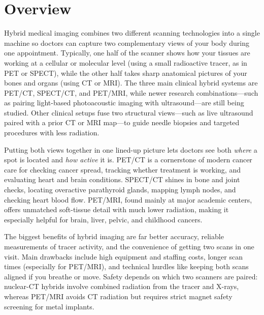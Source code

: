 \label{ch:infographic-hybrid-imaging}

\section{Overview}

Hybrid medical imaging combines two different scanning technologies into a single machine so doctors can capture two complementary views of your body during one appointment. Typically, one half of the scanner shows how your tissues are working at a cellular or molecular level (using a small radioactive tracer, as in PET or SPECT), while the other half takes sharp anatomical pictures of your bones and organs (using CT or MRI). The three main clinical hybrid systems are PET/CT, SPECT/CT, and PET/MRI, while newer research combinations---such as pairing light-based photoacoustic imaging with ultrasound---are still being studied. Other clinical setups fuse two structural views---such as live ultrasound paired with a prior CT or MRI map---to guide needle biopsies and targeted procedures with less radiation.

Putting both views together in one lined-up picture lets doctors see both \emph{where} a spot is located and \emph{how active} it is. PET/CT is a cornerstone of modern cancer care for checking cancer spread, tracking whether treatment is working, and evaluating heart and brain conditions. SPECT/CT shines in bone and joint checks, locating overactive parathyroid glands, mapping lymph nodes, and checking heart blood flow. PET/MRI, found mainly at major academic centers, offers unmatched soft-tissue detail with much lower radiation, making it especially helpful for brain, liver, pelvic, and childhood cancers.

The biggest benefits of hybrid imaging are far better accuracy, reliable measurements of tracer activity, and the convenience of getting two scans in one visit. Main drawbacks include high equipment and staffing costs, longer scan times (especially for PET/MRI), and technical hurdles like keeping both scans aligned if you breathe or move. Safety depends on which two scanners are paired: nuclear-CT hybrids involve combined radiation from the tracer and X-rays, whereas PET/MRI avoids CT radiation but requires strict magnet safety screening for metal implants.

